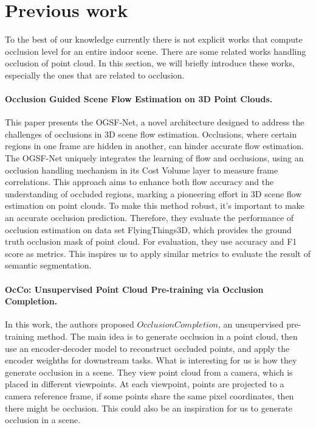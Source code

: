 \documentclass[11pt, a4paper,oneside,chapterprefix=false]{scrbook}
\begin{document}
\section{Previous work}
To the best of our knowledge currently there is not explicit works that compute occlusion level for an entire indoor scene. There are some related works handling occlusion of point cloud. In this section, we will briefly introduce these works, especially the ones that are related to occlusion.  


\paragraph{Occlusion Guided Scene Flow Estimation on 3D Point Clouds.} \label{par:scene flow}

This paper presents the OGSF-Net, a novel architecture designed to address the challenges of occlusions in 3D scene flow estimation. Occlusions, where certain regions in one frame are hidden in another, can hinder accurate flow estimation. The OGSF-Net uniquely integrates the learning of flow and occlusions, using an occlusion handling mechanism in its Cost Volume layer to measure frame correlations. This approach aims to enhance both flow accuracy and the understanding of occluded regions, marking a pioneering effort in 3D scene flow estimation on point clouds. To make this method robust, it's important to make an accurate occlusion prediction. Therefore, they evaluate the performance of occlusion estimation on data set FlyingThings3D, which provides the ground truth occlusion mask of point cloud. For evaluation, they use accuracy and F1 score as metrics. This inspires us to apply similar metrics to evaluate the result of semantic segmentation.

\paragraph{OcCo: Unsupervised Point Cloud Pre-training via Occlusion Completion.} \label{par:OcCo occlusion completion}

In this work, the authors proposed ${Occlusion Completion}$, an unsupervised pre-training method. The main idea is to generate occlusion in a point cloud, then use an encoder-decoder model to reconstruct occluded points, and apply the encoder weighths for downstream tasks. What is interesting for us is how they generate occlusion in a scene. They view point cloud from a camera, which is placed in different viewpoints. At each viewpoint, points are projected to a camera reference frame, if some points share the same pixel coordinates, then there might be occlusion. This could also be an inspiration for us to generate occlusion in a scene.
\end{document}
